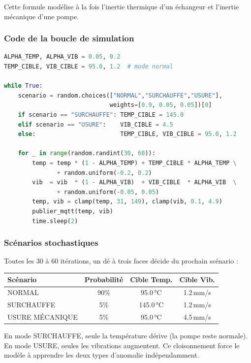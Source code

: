 \documentclass[12pt,a4paper]{article}
\begin{document}
Cette formule modélise à la fois l'inertie thermique d'un échangeur et l'inertie mécanique d'une pompe.

\subsubsection{Code de la boucle de simulation}

\begin{lstlisting}[language=Python,caption={Noyau de la simulation inertielle}]
ALPHA_TEMP, ALPHA_VIB = 0.05, 0.2
TEMP_CIBLE, VIB_CIBLE = 95.0, 1.2  # mode normal

while True:
    scenario = random.choices(["NORMAL","SURCHAUFFE","USURE"],
                              weights=[0.9, 0.05, 0.05])[0]
    if scenario == "SURCHAUFFE": TEMP_CIBLE = 145.0
    elif scenario == "USURE":    VIB_CIBLE = 4.5
    else:                        TEMP_CIBLE, VIB_CIBLE = 95.0, 1.2

    for _ in range(random.randint(30, 60)):
        temp = temp * (1 - ALPHA_TEMP) + TEMP_CIBLE * ALPHA_TEMP \
               + random.uniform(-0.2, 0.2)
        vib  = vib  * (1 - ALPHA_VIB)  + VIB_CIBLE  * ALPHA_VIB  \
               + random.uniform(-0.05, 0.05)
        temp, vib = clamp(temp, 31, 149), clamp(vib, 0.1, 4.9)
        publier_mqtt(temp, vib)
        time.sleep(2)
\end{lstlisting}

\subsubsection{Scénarios stochastiques}

Toutes les 30 à 60 itérations, un dé à trois faces décide du prochain scénario :

\begin{center}
\begin{tabular}{|l|c|c|c|}
\hline
\textbf{Scénario} & \textbf{Probabilité} & \textbf{Cible Temp.} & \textbf{Cible Vib.} \\
\hline
NORMAL & 90\% & 95.0\,°C & 1.2\,mm/s \\
SURCHAUFFE & 5\% & 145.0\,°C & 1.2\,mm/s \\
USURE MÉCANIQUE & 5\% & 95.0\,°C & 4.5\,mm/s \\
\hline
\end{tabular}
\end{center}

En mode SURCHAUFFE, seule la température dérive (la pompe reste normale). En mode USURE, seules les vibrations augmentent. Ce cloisonnement force le modèle à apprendre les deux types d'anomalie indépendamment.
\end{document}
